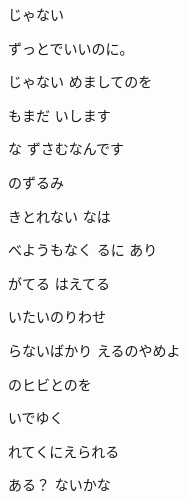 \documentclass[a4paper,tate,twocolumn,12pt]{ltjtarticle}
\begin{document}
\thispagestyle{empty}

\begin{center}
{\LARGE {}じゃない}

{\large ずっとでいいのに。}
\end{center}

\vspace{1em}

\begin{flushleft}

\noindent\begin{minipage}{\linewidth}
じゃない  めましてのを

もまだ いします

な ずさむなんです
\end{minipage}

\vspace{2em}

\noindent\begin{minipage}{\linewidth}
のずるみ

きとれない なは

べようもなく るに あり

がてる はえてる

いたいのりわせ

らないばかり えるのやめよ
\end{minipage}

\vspace{2em}

\noindent\begin{minipage}{\linewidth}
のヒビとのを

いでゆく

れてくにえられる

ある？ ないかな
\end{minipage}

\vspace{2em}


\end{flushleft}
\end{document}
